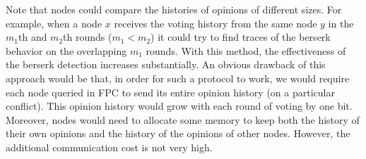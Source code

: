 \documentclass[../main.tex]{subfiles}
\begin{document}
Note that nodes could compare the histories of opinions of different sizes. For example, when a node $x$ receives the voting history from the same node $y$ in the $m_1$th and $m_2$th rounds ($m_1 < m_2$) it could try to find traces of the berserk behavior on the overlapping $m_1$ rounds. With this method, the effectiveness of the berserk detection increases substantially. An obvious drawback of this approach would be that, in order for such a protocol to work, we would require each node queried in FPC to send its entire opinion history (on a particular  conflict). This opinion history would grow with each round of voting by one bit. Moreover, nodes would need to allocate some memory to keep both the history of their own opinions and the history of the opinions of other nodes. However, the additional communication cost is not very high. 
\newline
\newline
\end{document}
